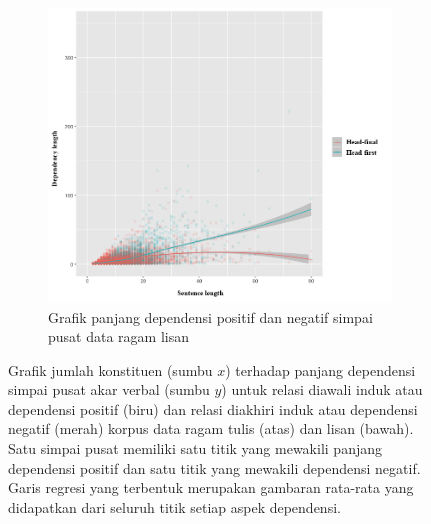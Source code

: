 \documentclass[10pt, a4paper, conference, compsocconf]{IEEEtran}
\begin{document}
\begin{figure}
\begin{subfigure}{.7\linewidth}
  \includegraphics[width=1\linewidth]{pics/lisanroot_DLposneg.png} 
	\caption{Grafik panjang dependensi positif dan negatif simpai pusat data ragam lisan}
	\label{fig:lisanroot_DLposneg} 
\end{subfigure}

\caption{Grafik jumlah konstituen (sumbu $x$) terhadap panjang dependensi simpai pusat akar verbal (sumbu $y$) untuk relasi diawali induk atau dependensi positif (biru) dan relasi diakhiri induk atau dependensi negatif (merah) korpus data ragam tulis (atas) dan lisan (bawah). Satu simpai pusat memiliki satu titik yang mewakili panjang dependensi positif dan satu titik yang mewakili dependensi negatif. Garis regresi yang terbentuk merupakan gambaran rata-rata yang didapatkan dari seluruh titik setiap aspek dependensi.}
\label{fig:rootDL_posneg}
\end{figure}
\end{document}
